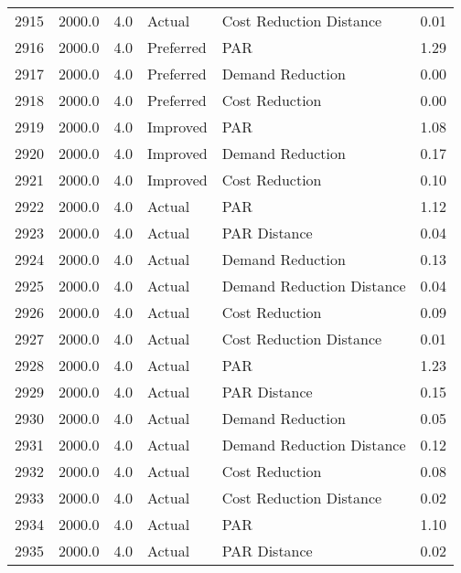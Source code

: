 \begin{longtable}{lrrllr}
2915 &       2000.0 &     4.0 &         Actual &    Cost Reduction Distance &   0.01 \\
2916 &       2000.0 &     4.0 &      Preferred &                        PAR &   1.29 \\
2917 &       2000.0 &     4.0 &      Preferred &           Demand Reduction &   0.00 \\
2918 &       2000.0 &     4.0 &      Preferred &             Cost Reduction &   0.00 \\
2919 &       2000.0 &     4.0 &       Improved &                        PAR &   1.08 \\
2920 &       2000.0 &     4.0 &       Improved &           Demand Reduction &   0.17 \\
2921 &       2000.0 &     4.0 &       Improved &             Cost Reduction &   0.10 \\
2922 &       2000.0 &     4.0 &         Actual &                        PAR &   1.12 \\
2923 &       2000.0 &     4.0 &         Actual &               PAR Distance &   0.04 \\
2924 &       2000.0 &     4.0 &         Actual &           Demand Reduction &   0.13 \\
2925 &       2000.0 &     4.0 &         Actual &  Demand Reduction Distance &   0.04 \\
2926 &       2000.0 &     4.0 &         Actual &             Cost Reduction &   0.09 \\
2927 &       2000.0 &     4.0 &         Actual &    Cost Reduction Distance &   0.01 \\
2928 &       2000.0 &     4.0 &         Actual &                        PAR &   1.23 \\
2929 &       2000.0 &     4.0 &         Actual &               PAR Distance &   0.15 \\
2930 &       2000.0 &     4.0 &         Actual &           Demand Reduction &   0.05 \\
2931 &       2000.0 &     4.0 &         Actual &  Demand Reduction Distance &   0.12 \\
2932 &       2000.0 &     4.0 &         Actual &             Cost Reduction &   0.08 \\
2933 &       2000.0 &     4.0 &         Actual &    Cost Reduction Distance &   0.02 \\
2934 &       2000.0 &     4.0 &         Actual &                        PAR &   1.10 \\
2935 &       2000.0 &     4.0 &         Actual &               PAR Distance &   0.02 \\

\end{longtable}
